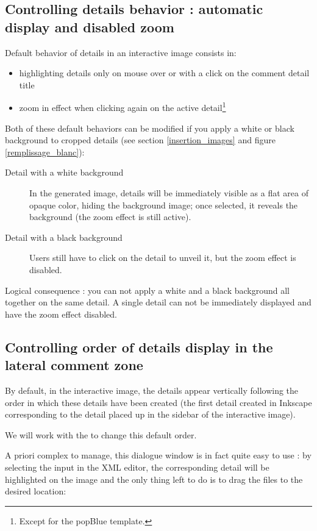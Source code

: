 \subsection{Controlling details behavior : automatic display and disabled zoom}\label{white_black_background}
\label{couche_XML}

Default behavior of details in an interactive image consists in:
\begin{itemize}
 \item highlighting details only on mouse over or with a click on the comment 
 detail title
 \item zoom in effect when clicking again on the active detail\footnote{Except 
 for the popBlue template.}
\end{itemize}

Both of these default behaviors can be modified if you apply a white
 or black background to cropped details (see section 
\ref{insertion_images} 
 and figure
\ref{remplissage_blanc}):
\begin{description}
 \item [Detail with a white background] In the generated image, details will be
 immediately visible as a flat area of opaque color, hiding the background image;  
 once selected, it reveals the background (the zoom effect is still active).
 \item [Detail with a black background] Users still have to click on the detail to unveil it, but the zoom effect is disabled.
\end{description}

Logical consequence : you can not apply a white and a black background all together on the same detail.
A single detail can not be immediately displayed and have the zoom effect disabled.

\subsection{Controlling order of details display in the lateral comment zone}

By default, in the interactive image, the details appear vertically following the order in which these details have been created (the first detail created in Inkscape corresponding to the detail placed up in the sidebar of the interactive image).

We will work with the  to change this default order.

A priori complex to manage, this dialogue window is in fact quite easy to use : 
by selecting the input in the XML editor, the corresponding detail will be
highlighted on the image and the only thing left 
to do is to drag the files to the desired location:\\

